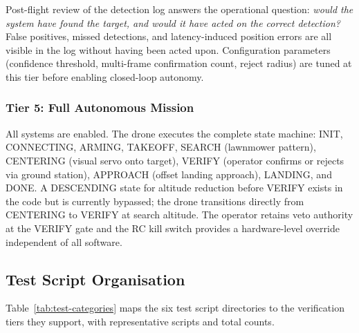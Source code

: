 Post-flight review of the detection log answers the operational question: \emph{would the system have found the target, and would it have acted on the correct detection?} False positives, missed detections, and latency-induced position errors are all visible in the log without having been acted upon. Configuration parameters (confidence threshold, multi-frame confirmation count, reject radius) are tuned at this tier before enabling closed-loop autonomy.

\subsubsection{Tier 5: Full Autonomous Mission}

All systems are enabled. The drone executes the complete state machine: INIT, CONNECTING, ARMING, TAKEOFF, SEARCH (lawnmower pattern), CENTERING (visual servo onto target), VERIFY (operator confirms or rejects via ground station), APPROACH (offset landing approach), LANDING, and DONE. A DESCENDING state for altitude reduction before VERIFY exists in the code but is currently bypassed; the drone transitions directly from CENTERING to VERIFY at search altitude. The operator retains veto authority at the VERIFY gate and the RC kill switch provides a hardware-level override independent of all software.

\subsection{Test Script Organisation}\label{sec:test-org-detail}

Table~\ref{tab:test-categories} maps the six test script directories to the verification tiers they support, with representative scripts and total counts.

